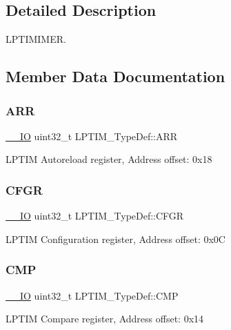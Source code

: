 \subsection{Detailed Description}
L\+P\+T\+I\+M\+I\+M\+ER. 

\subsection{Member Data Documentation}
\mbox{\label{struct_l_p_t_i_m___type_def_a0aa430eedacf1806e078057cd5e6970c}} 
\subsubsection{\texorpdfstring{ARR}{ARR}}
{\footnotesize\ttfamily \mbox{\hyperlink{core__sc300_8h_aec43007d9998a0a0e01faede4133d6be}{\+\_\+\+\_\+\+IO}} uint32\+\_\+t L\+P\+T\+I\+M\+\_\+\+Type\+Def\+::\+A\+RR}

L\+P\+T\+IM Autoreload register, Address offset\+: 0x18 \mbox{\label{struct_l_p_t_i_m___type_def_a35c555cdc39e12f291f1e96bdf953ec4}} 
\subsubsection{\texorpdfstring{CFGR}{CFGR}}
{\footnotesize\ttfamily \mbox{\hyperlink{core__sc300_8h_aec43007d9998a0a0e01faede4133d6be}{\+\_\+\+\_\+\+IO}} uint32\+\_\+t L\+P\+T\+I\+M\+\_\+\+Type\+Def\+::\+C\+F\+GR}

L\+P\+T\+IM Configuration register, Address offset\+: 0x0C \mbox{\label{struct_l_p_t_i_m___type_def_a0f22edd659052ecb52c692e507a8ebdc}} 
\subsubsection{\texorpdfstring{CMP}{CMP}}
{\footnotesize\ttfamily \mbox{\hyperlink{core__sc300_8h_aec43007d9998a0a0e01faede4133d6be}{\+\_\+\+\_\+\+IO}} uint32\+\_\+t L\+P\+T\+I\+M\+\_\+\+Type\+Def\+::\+C\+MP}

L\+P\+T\+IM Compare register, Address offset\+: 0x14 \mbox{\label{struct_l_p_t_i_m___type_def_a8c510cd4e483030373cb03eb347d65df}} 
